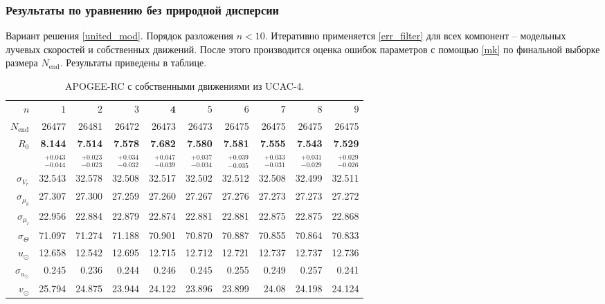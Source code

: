 \documentclass{matmex-diploma-custom}
\begin{document}
\subsubsection{Результаты по уравнению без природной дисперсии}
Вариант решения \ref{united_mod}. Порядок разложения $n < 10$. Итеративно применяется \ref{err_filter} для всех компонент -- модельных лучевых скоростей и собственных движений. После этого производится оценка ошибок параметров с помощью \ref{mk} по финальной выборке размера $N_{\mathrm{end}}$. Результаты приведены в таблице. 
\begin{table}[h!!]
\centering
\caption{APOGEE-RC с собственными движениями из UCAC-4.}
\begin{tabular}{r|rrr|r|rrrrr}
\hline
$n$ & $1$ & $2$ & $3$ & $\textbf{4}$ & $5$&$ 6 $&$ 7 $&$ 8 $&$ 9 $\\
 $N_{\mathrm{end}}$ & 26477       &    26481 &    26472 &    26473 &    26473 &    26475 &    26475 &    26475 &    26475 \\
 $R_0 $&  \textbf{8.144}       &   \textbf{ 7.514} &    \textbf{7.578} &    \textbf{7.682} &  \textbf{   7.580} &  \textbf{  7.581} &  \textbf{  7.555} &  \textbf{  7.543} &  \textbf{  7.529} \\
       & $_{-0.044}^{+0.043} $ & $_{-0.023}^{+0.023}$ & $_{-0.032}^{+0.034}$   & $_{-0.039}^{+0.047}$  & $_{-0.034}^{+0.037}$  & $_{-0.035}^{+0.039}$  & $_{-0.031}^{+0.033}$  & $_{-0.029}^{+0.031}$  & $_{-0.026}^{+0.029}$  \\\hline
 $\sigma_{V_r} $& 32.543      &  32.578 &  32.508 &  32.517 &  32.502 &  32.512 &  32.508 &  32.499 &  32.511  \\ 
 $\sigma_{\mu_b} $& 27.307      &  27.300 &  27.259 &  27.260 &  27.267 &  27.276 &  27.273 &  27.273 &  27.272  \\ 
 $\sigma_{\mu_l} $& 22.956      &  22.884 &  22.879 &  22.874 &  22.881 &  22.881 &  22.875 &  22.875 &  22.868  \\\hline 
 $\sigma_{\Theta} $& 71.097      &  71.274 &  71.188 &  70.901 &  70.870 &  70.887 &  70.855 &  70.864 &  70.833  \\\hline 
 $ u_{\odot} $& 12.658      &   12.542 &   12.695 &   12.715 &   12.712 &   12.721 &   12.737 &   12.737 &   12.736 \\
 $\sigma_{u_{\odot}} $&0.245       &    0.236 &    0.244 &    0.246 &    0.245 &    0.255 &    0.249 &    0.257 &    0.241 \\
 $v_{\odot} $& 25.794      &   24.875 &   23.944 &   24.122 &   23.896 &   23.899 &    24.08 &   24.198 &   24.124 \\

\end{tabular}
\end{table}
\end{document}
